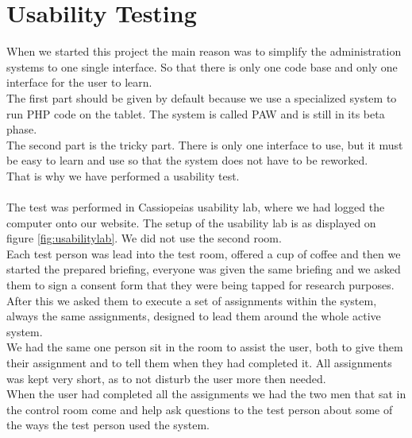 \chapter{Usability Testing}
When we started this project the main reason was to simplify the administration systems to one single interface. So that there is only one code base and only one interface for the user to learn.\\
The first part should be given by default because we use a specialized system to run PHP code on the tablet. The system is called PAW \citep{paw} and is still in its beta phase.\\
The second part is the tricky part. There is only one interface to use, but it must be easy to learn and use so that the system does not have to be reworked.\\
That is why we have performed a usability test.\\
\\

The test was performed in Cassiopeias usability lab, where we had logged the computer onto our website. The setup of the usability lab is as displayed on figure \ref{fig:usabilitylab}. We did not use the second room.\\
Each test person was lead into the test room, offered a cup of coffee and then we started the prepared briefing, everyone was given the same briefing and we asked them to sign a consent form that they were being tapped for research purposes.\\
After this we asked them to execute a set of assignments within the system, always the same assignments, designed to lead them around the whole active system. \\
We had the same one person sit in the room to assist the user, both to give them their assignment and to tell them when they had completed it. All assignments was kept very short, as to not disturb the user more then needed.\\
When the user had completed all the assignments we had the two men that sat in the control room come and help ask questions to the test person about some of the ways the test person used the system.\\
\\

